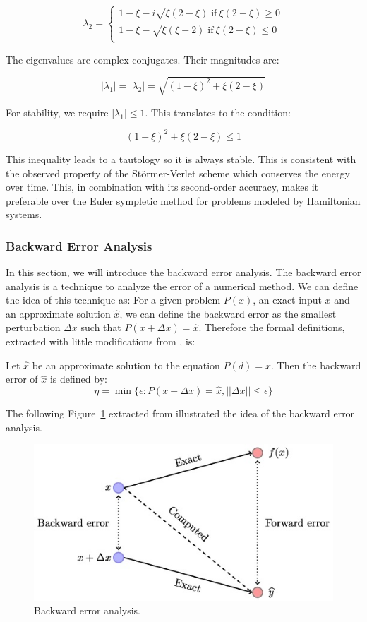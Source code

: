 \documentclass{article}
\begin{document}
\[
	\lambda_2 = \begin{cases}
		1 - \xi - i\sqrt{\xi(2-\xi)} \ \text{if} \ \xi(2-\xi) \geq 0 \\
		1 - \xi - \sqrt{\xi(\xi - 2)} \ \text{if} \ \xi(2-\xi) \leq 0 \\
	\end{cases}
\]

The eigenvalues are complex conjugates. Their magnitudes are:

\[
	|\lambda_1| = |\lambda_2| = \sqrt{(1 - \xi)^2 + \xi(2-\xi)} 
\]

For stability, we require \( |\lambda_1| \leq 1 \). This translates to the condition:

\[
	(1 - \xi)^2 + \xi(2-\xi) \leq 1
\]

This inequality leads to a tautology so it is always stable. This is consistent with the observed property of the Störmer-Verlet scheme which conserves the energy over time. This, in combination with its second-order accuracy, makes it preferable over the Euler sympletic method for problems modeled by Hamiltonian systems.

\subsubsection{Backward Error Analysis}
\label{sec:backward_error_analysis}

In this section, we will introduce the backward error analysis. The backward error analysis is a technique to analyze the error of a numerical method. We can define the idea of this technique as: For a given problem \(P(x)\), an exact input \(x\) and an approximate solution \(\hat{x}\), we can define the backward error as the smallest perturbation \(\Delta x\) such that \(P(x + \Delta x) = \hat{x}\). Therefore the formal definitions, extracted with little modifications from \cite{fraysse2018hdr}, is:

\begin{definition}
	Let \(\hat{x}\) be an approximate solution to the equation \(P(d) = x\). Then the backward error of \(\hat{x}\) is defined by:
	\[
		\eta = \min \{ \epsilon : P(x + \Delta x) = \hat{x}, ||\Delta x|| \leq \epsilon \}
	\]
\end{definition}

The following Figure~\ref{fig:backwarderror} extracted from \cite{higham2020backwarderror} illustrated the idea of the backward error analysis.

\begin{figure}[H]
	\centering
	\includegraphics[width=0.5\linewidth]{./Figures/Sympletic/graphic.jpg}
	\caption{Backward error analysis.}
	\label{fig:backwarderror}
\end{figure}
\end{document}
